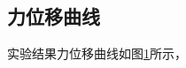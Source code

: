 \begin{figure}
{	\label{fig:PTFE-braid-tube-1}
}
\hspace{0.5cm}
\label{fig:tesile-experiment-II}
\end{figure}


\subsection{力位移曲线}
实验结果力位移曲线如图\ref{fig:tesile-experiment-II}所示，

